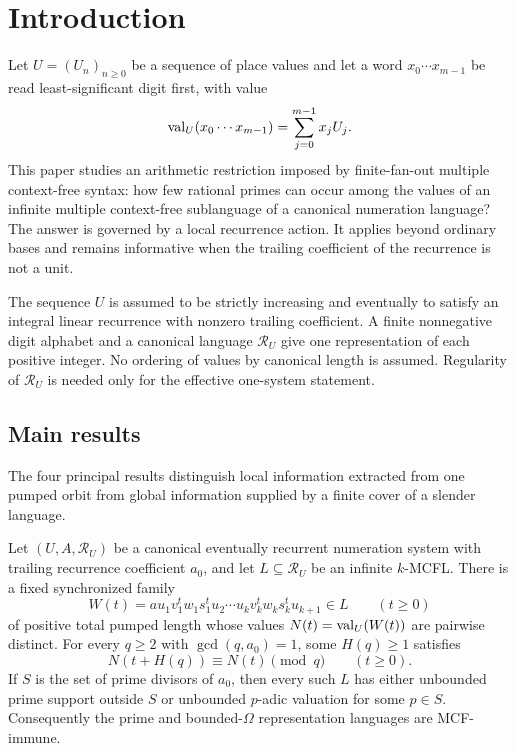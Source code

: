 \section{Introduction}\label{sec:introduction}

Let \(U=(U_n)_{n\ge0}\) be a sequence of place values and let a word
\(x_0\cdots x_{m-1}\) be read least-significant digit first, with value
\[
  \operatorname{val}_U(x_0\cdots x_{m-1})=\sum_{j=0}^{m-1}x_jU_j.
\]
This paper studies an arithmetic restriction imposed by finite-fan-out
multiple context-free syntax: how few rational primes can occur among the
values of an infinite multiple context-free sublanguage of a canonical
numeration language? The answer is governed by a local recurrence action.
It applies beyond ordinary bases and remains informative when the trailing
coefficient of the recurrence is not a unit.

The sequence \(U\) is assumed to be strictly increasing and eventually to
satisfy an integral linear recurrence with nonzero trailing coefficient. A
finite nonnegative digit alphabet and a canonical language \(\mathcal R_U\)
give one representation of each positive integer. No ordering of values by
canonical length is assumed. Regularity of \(\mathcal R_U\) is needed only
for the effective one-system statement.

\subsection{Main results}

The four principal results distinguish local information extracted from
one pumped orbit from global information supplied by a finite cover of a
slender language.

\begin{maintheorem}
Let \((U,A,\mathcal R_U)\) be a canonical eventually recurrent numeration
system with trailing recurrence coefficient \(a_0\), and let
\(L\subseteq\mathcal R_U\) be an infinite \(k\)-MCFL. There is a fixed
synchronized family
\[
  W(t)=a u_1v_1^tw_1s_1^tu_2\cdots
       u_kv_k^tw_ks_k^tu_{k+1}\in L \qquad(t\ge0)
\]
of positive total pumped length whose values \(N(t)=\operatorname{val}_U(W(t))\) are
pairwise distinct. For every \(q\ge2\) with \(\gcd(q,a_0)=1\), some
\(H(q)\ge1\) satisfies
\[
  N(t+H(q))\equiv N(t)\pmod q \qquad(t\ge0).
\]
If \(S\) is the set of prime divisors of \(a_0\), then every such \(L\)
has either unbounded prime support outside \(S\) or unbounded \(p\)-adic
valuation for some \(p\in S\). Consequently the prime and
bounded-\(\Omega\) representation languages are MCF-immune.
\end{maintheorem}

